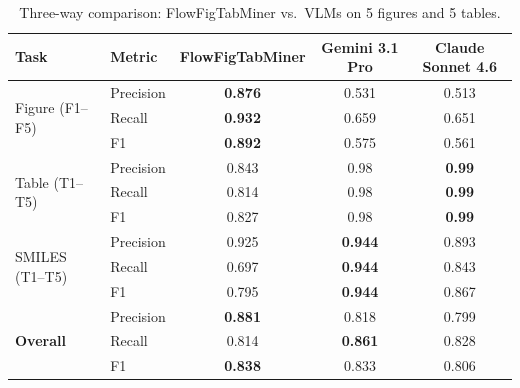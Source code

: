 %

\begin{table}[htbp]
\centering
\caption{Three-way comparison: FlowFigTabMiner vs.\ VLMs on 5 figures and 5 tables.}
\label{tab:three-way-comparison}
\begin{tabular}{llccc}
\toprule
\textbf{Task} & \textbf{Metric} & \textbf{FlowFigTabMiner} & \textbf{Gemini 3.1 Pro} & \textbf{Claude Sonnet 4.6} \\
\midrule
\multirow{3}{*}{Figure (F1--F5)}
  & Precision & \textbf{0.876} & 0.531 & 0.513 \\
  & Recall    & \textbf{0.932} & 0.659 & 0.651 \\
  & F1        & \textbf{0.892} & 0.575 & 0.561 \\
\midrule
\multirow{3}{*}{Table (T1--T5)}
  & Precision & 0.843 & 0.98  & \textbf{0.99} \\
  & Recall    & 0.814 & 0.98  & \textbf{0.99} \\
  & F1        & 0.827 & 0.98  & \textbf{0.99} \\
\midrule
\multirow{3}{*}{SMILES (T1--T5)}
  & Precision & 0.925 & \textbf{0.944} & 0.893 \\
  & Recall    & 0.697 & \textbf{0.944} & 0.843 \\
  & F1        & 0.795 & \textbf{0.944} & 0.867 \\
\midrule
\multirow{3}{*}{\textbf{Overall}}
  & Precision & \textbf{0.881} & 0.818 & 0.799 \\
  & Recall    & 0.814 & \textbf{0.861} & 0.828 \\
  & F1        & \textbf{0.838} & 0.833 & 0.806 \\
\bottomrule
\end{tabular}
\end{table}
